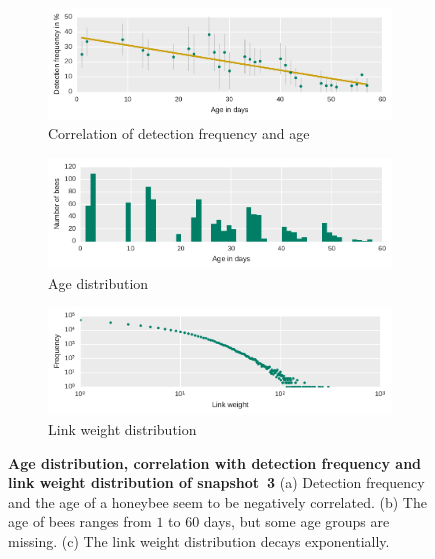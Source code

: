 \begin{figure}[bp]
	\centering
	\begin{subfigure}[b]{1\textwidth}
	\centering
	\includegraphics[width=1.0\textwidth]{Figures/n3_detFvsAge}
	\caption[Correlation]{Correlation of detection frequency and age}
	\label{fig:n3detfVSage}
	\vspace{6mm}
	\end{subfigure} 
	\begin{subfigure}[b]{1\textwidth}
	\centering
	\includegraphics[width=1.0\textwidth]{Figures/n3_ages.pdf}
	\caption[Age distribution]{Age distribution}
	\label{fig:n3ageDist}
	\vspace{6mm}
	\end{subfigure}	\begin{subfigure}[b]{1\textwidth}
	\centering
	\includegraphics[width=1.0\textwidth]{Figures/n3-edgeWeightDist.pdf}
	\caption[Link weight distribution]{Link weight distribution}
	\label{fig:edgeWdist}
	\end{subfigure}
	\caption[Age distribution, correlation with detection frequency and link weight distribution of snapshot~3]{\textbf{Age distribution, correlation with detection frequency and link weight distribution of snapshot~3} (a) Detection frequency and the age of a honeybee seem to be negatively correlated. (b) The age of bees ranges from $1$ to $60$ days, but some age groups are missing. (c) The link weight distribution decays exponentially.}
	\label{fig:ageDetF}
\end{figure}